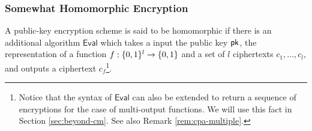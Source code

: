 %

\subsubsection{Somewhat Homomorphic Encryption}
A public-key encryption scheme is said to be homomorphic if there is an 
additional algorithm $\mathsf{Eval}$ which takes a input the public key $\mathsf{pk}$, 
the representation of a function $f:\{0, 1\}^l\rightarrow\{0, 1\}$ and a set of $l$ ciphertexts $c_1,\ldots,c_l$, and outputs a ciphertext $c_f$\footnote{Notice that the syntax of $\mathsf{Eval}$ can also be extended to return a sequence of encryptions for the case of multi-output functions. We will use this fact in Section \ref{sec:beyond-cm}. See also Remark \ref{rem:cpa-multiple}.}. 





